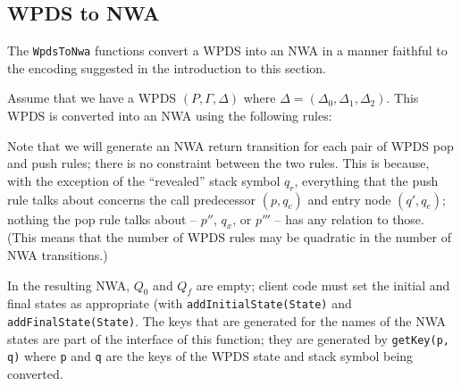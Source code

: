 \subsection{WPDS to NWA}
\label{Se:WpdsToNwa}

The \texttt{WpdsToNwa} functions convert a WPDS into an NWA in a manner
faithful to the encoding suggested in the introduction to this section.

Assume that we have a WPDS $(P, \Gamma, \Delta )$ 
where $\Delta = (\Delta_0, \Delta_1, \Delta_2)$. This 
WPDS is converted into an NWA using the following rules:


Note that we will generate an NWA return transition for each pair of WPDS pop
and push rules; there is no constraint between the two rules.  This is
because, with the exception of the ``revealed'' stack symbol $q_r$,
everything that the push rule talks about concerns the call predecessor
$(p,q_c)$ and entry node $(q', q_e)$; nothing the pop rule talks about --
$p''$, $q_x$, or $p'''$ -- has any relation to those. (This means that the
number of WPDS rules may be quadratic in the number of NWA transitions.)


In the resulting NWA, $Q_0$ and $Q_f$ are empty; client code must set the initial and
final states as appropriate (with \texttt{addInitialState(State)} and
\texttt{addFinalState(State)}. The keys that are generated for the names of the
NWA states are part of the interface of this function; they are generated by
\texttt{getKey(p, q)} where \texttt{p} and \texttt{q} are the keys of the
WPDS state and stack symbol being converted.


